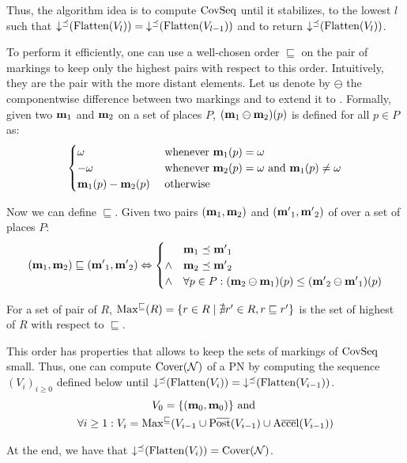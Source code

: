 Thus, the algorithm idea is to compute $\operatorname{CovSeq}$ until it stabilizes,  to the lowest $l$ such that $\operatorname{\downarrow^\preceq}(\operatorname{Flatten}(V_l)) = \operatorname{\downarrow^\preceq}(\operatorname{Flatten}(V_{l-1}))$ and to return $\operatorname{\downarrow^\preceq}(\operatorname{Flatten}(V_l))$.

To perform it efficiently, one can use a well-chosen order $\sqsubseteq$ on the pair of markings to keep only the highest pairs with respect to this order.
Intuitively, they are the pair with the more distant elements.
Let us denote by $\ominus$ the componentwise difference between two markings and to extend it to \omarks.
Formally, given two \omarks $\mathbf{m}_1$ and $\mathbf{m}_2$ on a set of places $P$, $(\mathbf{m}_1 \ominus \mathbf{m}_2)(p)$ is defined for all $p \in P$ as:
\[
  \begin{cases}
    \omega & \text{ whenever } \mathbf{m}_1(p) = \omega \\
    -\omega & \text{ whenever } \mathbf{m}_2(p) = \omega \text{ and } \mathbf{m}_1(p) \neq \omega \\
    \mathbf{m}_1(p) - \mathbf{m}_2(p) & \text{ otherwise}
  \end{cases}
\]

Now we can define $\sqsubseteq$.
Given two pairs $(\mathbf{m}_1, \mathbf{m}_2)$ and $(\mathbf{m'}_1, \mathbf{m'}_2)$ of \omarks over a set of places $P$:
\[
  (\mathbf{m}_1, \mathbf{m}_2) \sqsubseteq (\mathbf{m'}_1, \mathbf{m'}_2) \Leftrightarrow
  \begin{cases}
    & \mathbf{m}_1 \preceq \mathbf{m'}_1 \\
    \wedge & \mathbf{m}_2 \preceq \mathbf{m'}_2 \\
    \wedge & \forall p \in P : (\mathbf{m}_2 \ominus \mathbf{m}_1)(p) \leq (\mathbf{m'}_2 \ominus \mathbf{m'}_1)(p)
  \end{cases}
\]

For a set of pair of \omarks $R$, $\operatorname{Max^\sqsubseteq}(R) = \{ r \in R \mid \nexists r' \in R, r \sqsubseteq r'\}$ is the set of highest \omark of $R$ with respect to $\sqsubseteq$.

This order has properties \citep{Geeraerts07} that allows to keep the sets of markings of $\operatorname{CovSeq}$ small.
Thus, one can compute $\operatorname{Cover}(\mathcal{N})$ of a \ac{PN} \NPTm by computing the sequence $(V_i)_{i \geq 0}$ defined below until $\operatorname{\downarrow^\preceq}(\operatorname{Flatten}(V_i)) = \operatorname{\downarrow^\preceq}(\operatorname{Flatten}(V_{i-1}))$.
\begin{gather*}
  V_0 = \{(\marqi, \marqi)\} \text{ and } \\
  \forall i \geq 1 : V_i = \maxs(V_{i-1} \cup \Postb(V_{i-1}) \cup \Accelb(V_{i-1}))
\end{gather*}

At the end, we have that $\operatorname{\downarrow^\preceq}(\operatorname{Flatten}(V_i)) = \operatorname{Cover}(\mathcal{N})$.

